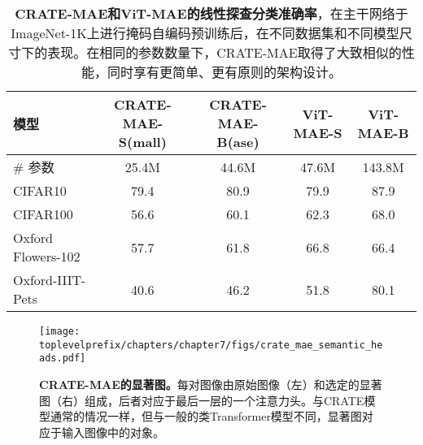 \documentclass[../../book-main.tex]{subfiles}
\begin{document}
\begin{table}
    \centering 
    \begin{tabular}{@{}lcc|cc@{}}
        \toprule 
        \textbf{模型} & CRATE-MAE-S(mall) & CRATE-MAE-B(ase) & {\color{gray} ViT-MAE-S} & {\color{gray} ViT-MAE-B} \\
        \midrule
        \midrule
        \# 参数 & 25.4M & 44.6M & 47.6M & {\color{gray}143.8M} \\
        \midrule
        CIFAR10 & 79.4 & 80.9 & {\color{gray} 79.9} & {\color{gray} 87.9} \\
        CIFAR100 & 56.6 & 60.1 & {\color{gray} 62.3} & {\color{gray} 68.0} \\
        Oxford Flowers-102 & 57.7 & 61.8 & {\color{gray} 66.8} & {\color{gray} 66.4} \\
        Oxford-IIIT-Pets & 40.6 & 46.2 & {\color{gray} 51.8} & {\color{gray} 80.1} \\
        \bottomrule
    \end{tabular}
    \caption{\small\textbf{CRATE-MAE和ViT-MAE的线性探查分类准确率}，在主干网络于ImageNet-1K上进行掩码自编码预训练后，在不同数据集和不同模型尺寸下的表现。在相同的参数数量下，CRATE-MAE取得了大致相似的性能，同时享有更简单、更有原则的架构设计。}
    \label{tab:crate_mae_linear_probing}
\end{table}

\begin{figure}
    \centering 
    \texttt{[image: \\toplevelprefix/chapters/chapter7/figs/crate\_mae\_semantic\_heads.pdf]}
    \caption{\small\textbf{CRATE-MAE的显著图。}每对图像由原始图像（左）和选定的显著图（右）组成，后者对应于最后一层的一个注意力头。与CRATE模型通常的情况一样，但与一般的类Transformer模型不同，显著图对应于输入图像中的对象。}
    \label{fig:crate_mae_semantic_heads}
\end{figure}




\end{document}
